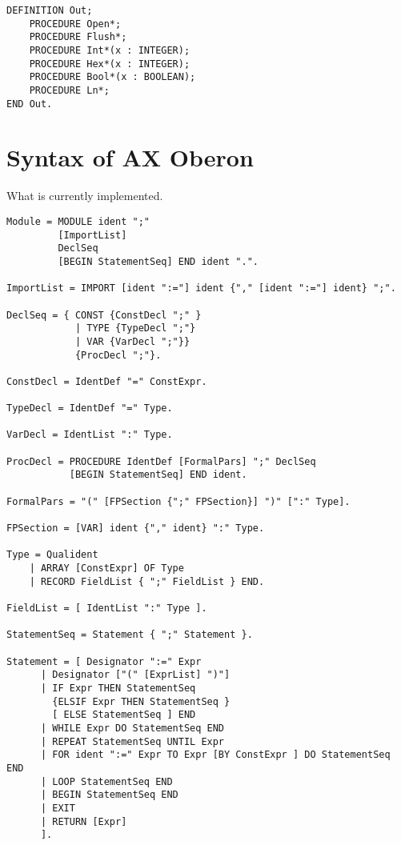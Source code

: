 \documentclass[12pt]{article}
\begin{document}
\begin{lstlisting}[style=oberon]
DEFINITION Out;
    PROCEDURE Open*;
    PROCEDURE Flush*;
    PROCEDURE Int*(x : INTEGER);
    PROCEDURE Hex*(x : INTEGER);
    PROCEDURE Bool*(x : BOOLEAN);
    PROCEDURE Ln*;
END Out.
\end{lstlisting} 


\newpage
\appendix

\section{Syntax of AX Oberon}

What is currently implemented.

{\scriptsize
\begin{lstlisting}[style=EBNF]
Module = MODULE ident ";" 
         [ImportList] 
         DeclSeq 
         [BEGIN StatementSeq] END ident ".".

ImportList = IMPORT [ident ":="] ident {"," [ident ":="] ident} ";".

DeclSeq = { CONST {ConstDecl ";" } 
            | TYPE {TypeDecl ";"} 
            | VAR {VarDecl ";"}} 
            {ProcDecl ";"}.

ConstDecl = IdentDef "=" ConstExpr.

TypeDecl = IdentDef "=" Type.

VarDecl = IdentList ":" Type.

ProcDecl = PROCEDURE IdentDef [FormalPars] ";" DeclSeq 
           [BEGIN StatementSeq] END ident.

FormalPars = "(" [FPSection {";" FPSection}] ")" [":" Type].

FPSection = [VAR] ident {"," ident} ":" Type.

Type = Qualident
    | ARRAY [ConstExpr] OF Type
    | RECORD FieldList { ";" FieldList } END.

FieldList = [ IdentList ":" Type ].
    
StatementSeq = Statement { ";" Statement }.

Statement = [ Designator ":=" Expr
      | Designator ["(" [ExprList] ")"]
      | IF Expr THEN StatementSeq 
        {ELSIF Expr THEN StatementSeq } 
        [ ELSE StatementSeq ] END
      | WHILE Expr DO StatementSeq END
      | REPEAT StatementSeq UNTIL Expr
      | FOR ident ":=" Expr TO Expr [BY ConstExpr ] DO StatementSeq END
      | LOOP StatementSeq END
      | BEGIN StatementSeq END
      | EXIT
      | RETURN [Expr] 
      ].


\end{lstlisting}}
\end{document}

